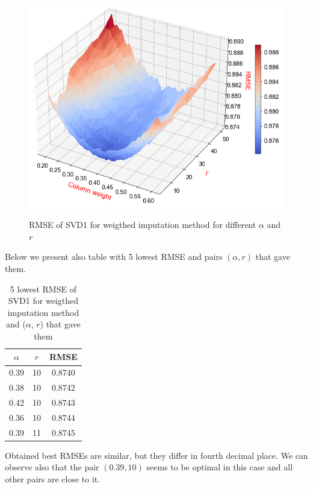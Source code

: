\documentclass[11pt]{amsart}
\begin{document}
\begin{figure}[H]
\includegraphics[scale=0.6]{fig/svd1_r_w2}
\label{fig:figure}
\caption{RMSE of SVD1 for weigthed imputation method for different $\alpha$ and $r$}
\end{figure}

Below we present also table with 5 lowest RMSE and pairs $(\alpha, r)$ that gave them.
\begin{table}[H]
\begin{tabular}{cc|c}
 $\alpha$ &  $r$ &     RMSE \\
\hline
       0.39 & 10 & 0.8740 \\
       0.38 & 10 & 0.8742 \\
       0.42 & 10 & 0.8743 \\
       0.36 & 10 & 0.8744 \\
       0.39 & 11 & 0.8745 \\
\end{tabular}
\caption{5 lowest RMSE of SVD1 for weigthed imputation method and ($\alpha$, $r$) that gave them}
\end{table}
Obtained best RMSEs are similar, but they differ in fourth decimal place.
We can observe also that the pair $(0.39, 10)$ seems to be optimal in this case and all other pairs are close to it.
\end{document}
